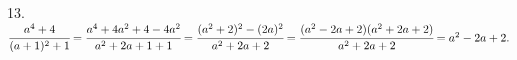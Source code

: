 13. $\cfrac{a^4+4}{(a+1)^2+1}=\cfrac{a^4+4a^2+4-4a^2}{a^2+2a+1+1}=\cfrac{(a^2+2)^2-(2a)^2}{a^2+2a+2}=\cfrac{(a^2-2a+2)(a^2+2a+2)}{a^2+2a+2}=a^2-2a+2.$\\
